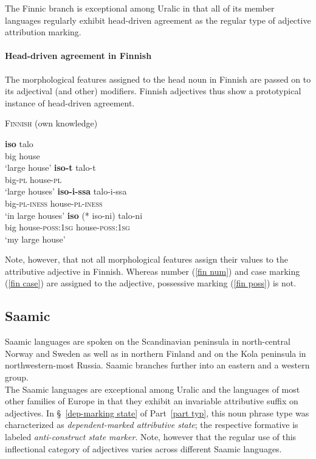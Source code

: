 \noindent The Finnic branch is exceptional among Uralic in that all of its member languages regularly exhibit head-driven agreement as the regular type of adjective attribution marking.

\paragraph{Head-driven agreement in Finnish} \label{finnish synchr}
The morphological features assigned to the head noun in Finnish are passed on to its adjectival (and other) modifiers. Finnish adjectives thus show a prototypical instance of head-driven agreement. 
\begin{exe}
\ex \textsc{Finnish} (own knowledge)
\begin{xlist}
\ex
\gll	\textbf{iso} talo\\
	big house\\
\glt	‘large house’
\ex	\label{fin num}
\gll	\textbf{iso-t} talo-t\\
	big-\textsc{pl} house-\textsc{pl}\\
\glt	‘large houses’
\ex	\label{fin case}
\gll	\textbf{iso-i-ssa}	talo-i-ssa\\
	big-\textsc{pl}-\textsc{iness} house-\textsc{pl}-\textsc{iness}\\
\glt	‘in large houses’
\ex 	\label{fin poss}
\gll	\textbf{iso} (* iso-ni) talo-ni\\
	big {} house-\textsc{poss:1sg} house-\textsc{poss:1sg}\\
\glt	‘my large house’
\end{xlist}
\end{exe}
Note, however, that not all morphological features assign their values to the attributive adjective in Finnish. Whereas number (\ref{fin num}) and case marking (\ref{fin case}) are assigned to the adjective, possessive marking (\ref{fin poss}) is not.

\subsection{Saamic}\label{saami synchr}
Saamic languages are spoken on the Scandinavian peninsula in north-central Norway and Sweden as well as in northern Finland and on the Kola peninsula in northwestern-most Russia. Saamic branches further into an eastern and a western group.\\

\noindent The Saamic languages are exceptional among Uralic and the languages of most other families of Europe in that they exhibit an invariable attributive suffix on adjectives. In \S~\ref{dep-marking state} of Part~\ref{part typ}, this noun phrase type was characterized as \textit{dependent-marked attributive state}; the respective formative is labeled \textit{anti-construct state marker}. Note, however that the regular use of this inflectional category of adjectives varies across different Saamic languages.

